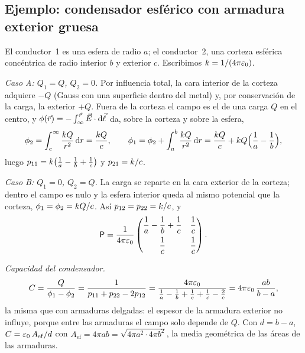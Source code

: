 \subsection{Ejemplo: condensador esférico con armadura exterior gruesa}\label{sec:ej-grueso}
\begin{ejemplo}\label{ej:grueso}
El conductor~1 es una esfera de radio $a$; el conductor~2, una corteza esférica concéntrica de radio interior $b$ y exterior $c$. Escribimos
$k=1/(4\pi\varepsilon_{0})$.

\emph{Caso A: $Q_1=Q$, $Q_2=0$.} Por influencia total, la cara interior de la corteza adquiere $-Q$ (Gauss con una superficie dentro del metal) y, por
conservación de la carga, la exterior $+Q$. Fuera de la corteza el campo es el de una carga $Q$ en el centro, y $\phi(\vec{r})=-\int_{\infty}^{\vec{r}}\vec{E}\cdot\mathrm{d}\vec{\ell}$
da, sobre la corteza y sobre la esfera,
\[
  \phi_2=\int_{c}^{\infty}\frac{k Q}{r^{2}}\,\mathrm{d} r=\frac{k Q}{c},\qquad
  \phi_1=\phi_2+\int_{a}^{b}\frac{k Q}{r^{2}}\,\mathrm{d} r=\frac{k Q}{c}+k Q\Bigl(\frac1a-\frac1b\Bigr),
\]
luego $p_{11}=k\bigl(\frac1a-\frac1b+\frac1c\bigr)$ y $p_{21}=k/c$.

\emph{Caso B: $Q_1=0$, $Q_2=Q$.} La carga se reparte en la cara exterior de la corteza; dentro el campo es nulo y la esfera interior queda al mismo potencial
que la corteza, $\phi_1=\phi_2=k Q/c$. Así $p_{12}=p_{22}=k/c$, y
\[
  \mathsf{P}=\frac{1}{4\pi\varepsilon_{0}}\begin{pmatrix}\dfrac1a-\dfrac1b+\dfrac1c & \dfrac1c\\[8pt] \dfrac1c & \dfrac1c\end{pmatrix}.
\]

\emph{Capacidad del condensador.}
\[
  C=\frac{Q}{\phi_1-\phi_2}=\frac{1}{p_{11}+p_{22}-2p_{12}}=\frac{4\pi\varepsilon_{0}}{\frac1a-\frac1b+\frac1c+\frac1c-\frac2c}=4\pi\varepsilon_{0}\,\frac{ab}{b-a} ,
\]
la misma que con armaduras delgadas: el espesor de la armadura exterior no influye, porque entre las armaduras el campo solo depende de $Q$. Con $d=b-a$,
$C=\varepsilon_{0}\,A_{\mathrm{ef}}/d$ con $A_{\mathrm{ef}}=4\pi ab=\sqrt{4\pi a^{2}\cdot4\pi b^{2}}$, la media geométrica de las áreas de las armaduras.


\end{ejemplo}
